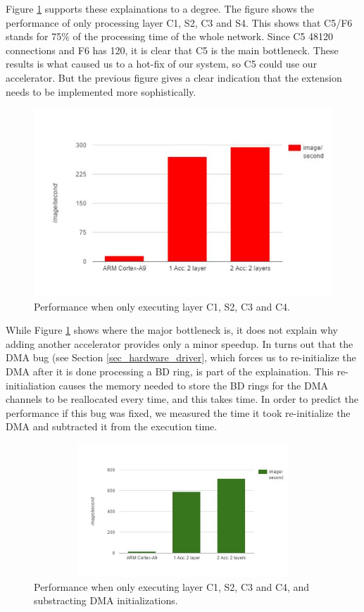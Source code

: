 Figure \ref{fig_performance_C1C2_only_accs} supports these explainations to a degree. The figure shows the performance of only processing layer C1, S2, C3 and S4. This shows that C5/F6 stands for 75\% of the processing time of the whole network. Since C5 48120 connections and F6 has 120, it is clear that C5 is the main bottleneck. These results is what caused us to a hot-fix of our system, so C5 could use our accelerator. But the previous figure gives a clear indication that the extension needs to be implemented more sophistically.

\begin{figure}[h!]
	\centering
	\includegraphics[width=1.0\textwidth]{Figures/Results/performance_C1C2_only_accs}
	\caption{Performance when only executing layer C1, S2, C3 and C4.}
	\label{fig_performance_C1C2_only_accs}
\end{figure}

While Figure \ref{fig_performance_C1C2_only_accs} shows where the major bottleneck is, it does not explain why adding another accelerator provides only a minor speedup. In turns out that the DMA bug (see Section \ref{sec_hardware_driver}, which forces us to re-initialize the DMA after it is done processing a BD ring, is part of the explaination. This re-initialiation causes the memory needed to store the BD rings for the DMA channels to be reallocated every time, and this takes time. In order to predict the performance if this bug was fixed, we measured the time it took re-initialize the DMA and subtracted it from the execution time.

\begin{figure}[h!]
	\centering
	\includegraphics[width=1.0\textwidth,height=5cm]{Figures/Results/performance_sub_dma_init}
	\caption{Performance when only executing layer C1, S2, C3 and C4, and substracting DMA initializations.}
	\label{fig_performance_sub_dma_init}
\end{figure}


